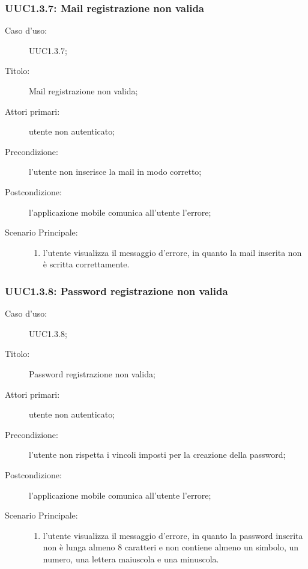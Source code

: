 \documentclass[../../../analisi-dei-requisiti.tex]{subfiles}
\begin{document}
\subsubsection{UUC1.3.7: Mail registrazione non valida}%
\label{subs:UUC1.3.7}
\begin{description}
  \item[Caso d'uso:] UUC1.3.7;
  \item[Titolo:] Mail registrazione non valida;
  \item[Attori primari:] utente non autenticato;
  \item[Precondizione:] l'utente non inserisce la mail in modo corretto;
  \item[Postcondizione:] l'applicazione mobile comunica all'utente l'errore;
  \item[Scenario Principale:]
        \begin{enumerate}
          \item l'utente visualizza il messaggio d'errore, in quanto la mail inserita non è scritta correttamente.
        \end{enumerate}
\end{description}

\subsubsection{UUC1.3.8: Password registrazione non valida}%
\label{subs:UUC1.3.8}
\begin{description}
  \item[Caso d'uso:] UUC1.3.8;
  \item[Titolo:] Password registrazione non valida;
  \item[Attori primari:] utente non autenticato;
  \item[Precondizione:] l'utente non rispetta i vincoli imposti per la creazione della password;
  \item[Postcondizione:] l'applicazione mobile comunica all'utente l'errore;
  \item[Scenario Principale:]
        \begin{enumerate}
          \item l'utente visualizza il messaggio d'errore, in quanto la password inserita non è lunga almeno 8 caratteri e non contiene almeno un simbolo, un numero, una lettera maiuscola e una minuscola.
        \end{enumerate}
\end{description}
\end{document}
